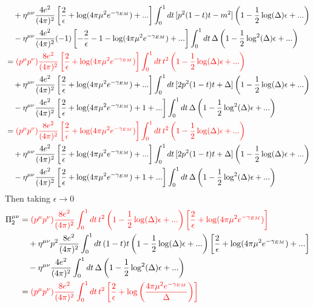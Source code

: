 \documentclass[10pt,a4paper]{article}
\theoremstyle{definition}
\begin{document}
\begin{enumerate}[1.]
\begin{enumerate}[1.)]
\begin{align}
&\quad+\eta^{\mu\nu}\frac{4e^2}{(4\pi)^2}\left[\frac{2}{\epsilon }+\log(4\pi\mu^2e^{-\gamma_{EM}})+...\right]\int_0^1dt\,[p^2(1-t)t-m^2]\left(1-\frac{1}{2}\log(\Delta)\epsilon+...\right)\\
&\quad-\eta^{\mu\nu}\frac{4e^2}{(4\pi)^2}(-1)\left[-\frac{2}{\epsilon }-1-\log (4\pi\mu^2e^{-\gamma_{EM}})+...\right]\int_0^1dt\,\Delta\left(1-\frac{1}{2}\log^2(\Delta)\epsilon+...\right)\\
&=\textcolor{red}{(p^\mu p^\nu)\frac{8e^2}{(4\pi)^2}\left[\frac{2}{\epsilon }+\log(4\pi\mu^2e^{-\gamma_{EM}})\right]\int_0^1dt\,t^2\left(1-\frac{1}{2}\log(\Delta)\epsilon+...\right)}\\
&\quad+\eta^{\mu\nu}\frac{4e^2}{(4\pi)^2}\left[\frac{2}{\epsilon }+\log(4\pi\mu^2e^{-\gamma_{EM}})+...\right]\int_0^1dt\,[2p^2(1-t)t+\Delta]\left(1-\frac{1}{2}\log(\Delta)\epsilon+...\right)\\
&\quad-\eta^{\mu\nu}\frac{4e^2}{(4\pi)^2}\left[\frac{2}{\epsilon }+\log (4\pi\mu^2e^{-\gamma_{EM}})+1+...\right]\int_0^1dt\,\Delta\left(1-\frac{1}{2}\log^2(\Delta)\epsilon+...\right)\\
&=\textcolor{red}{(p^\mu p^\nu)\frac{8e^2}{(4\pi)^2}\left[\frac{2}{\epsilon }+\log(4\pi\mu^2e^{-\gamma_{EM}})\right]\int_0^1dt\,t^2\left(1-\frac{1}{2}\log(\Delta)\epsilon+...\right)}\\
&\quad+\eta^{\mu\nu}\frac{4e^2}{(4\pi)^2}\left[\frac{2}{\epsilon }+\log(4\pi\mu^2e^{-\gamma_{EM}})+...\right]\int_0^1dt\,[2p^2(1-t)t+\Delta]\left(1-\frac{1}{2}\log(\Delta)\epsilon+...\right)\\
&\quad-\eta^{\mu\nu}\frac{4e^2}{(4\pi)^2}\left[\frac{2}{\epsilon }+\log (4\pi\mu^2e^{-\gamma_{EM}})+1+...\right]\int_0^1dt\,\Delta\left(1-\frac{1}{2}\log^2(\Delta)\epsilon+...\right)
\end{align}
Then taking $\epsilon\rightarrow0$ 
\begin{align}
\Pi_2^{\mu\nu}
&=\textcolor{red}{(p^\mu p^\nu)\frac{8e^2}{(4\pi)^2}\int_0^1dt\,t^2\left(1-\frac{1}{2}\log(\Delta)\epsilon+...\right)\left[\frac{2}{\epsilon }+\log(4\pi\mu^2e^{-\gamma_{EM}})\right]}\\
&\quad+\eta^{\mu\nu}p^2\frac{8e^2}{(4\pi)^2}\int_0^1dt\,(1-t)t\left(1-\frac{1}{2}\log(\Delta)\epsilon+...\right)\left[\frac{2}{\epsilon }+\log(4\pi\mu^2e^{-\gamma_{EM}})+...\right]\\
&\quad-\eta^{\mu\nu}\frac{4e^2}{(4\pi)^2}\int_0^1dt\,\Delta\left(1-\frac{1}{2}\log^2(\Delta)\epsilon+...\right)\\
%
&=\textcolor{red}{(p^\mu p^\nu)\frac{8e^2}{(4\pi)^2}\int_0^1dt\,t^2\left[\frac{2}{\epsilon }+\log\left(\frac{4\pi\mu^2e^{-\gamma_{EM}}}{\Delta}\right)\right]}\\

\end{align}
\end{enumerate}
\end{enumerate}
\end{document}

